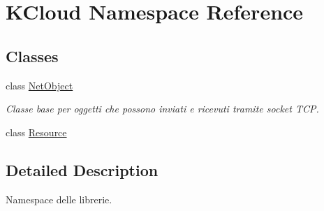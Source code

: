 \hypertarget{namespace_k_cloud}{\section{K\-Cloud Namespace Reference}
\label{namespace_k_cloud}
}
\subsection*{Classes}
\begin{DoxyCompactItemize}
\item 
class \hyperlink{class_k_cloud_1_1_net_object}{Net\-Object}
\begin{DoxyCompactList}\small\item\em Classe base per oggetti che possono inviati e ricevuti tramite socket T\-C\-P. \end{DoxyCompactList}\item 
class \hyperlink{class_k_cloud_1_1_resource}{Resource}
\end{DoxyCompactItemize}


\subsection{Detailed Description}
Namespace delle librerie. 